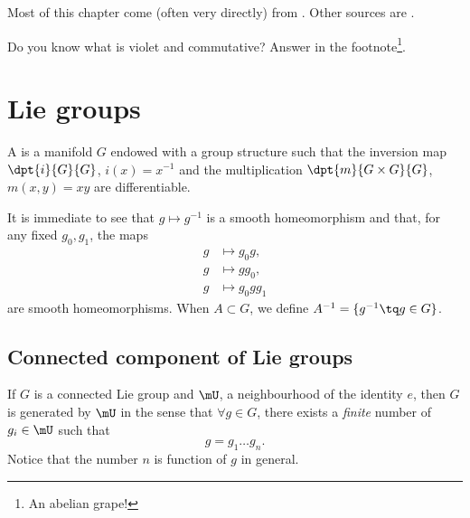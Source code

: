 
Most of this chapter come (often very directly) from \cite{Helgason}. Other sources are \cite{Knapp_reprez,DirkEnvFiniteDimNilLieAlg,SamelsonNotesLieAlg,SternLieAlgebra}.

Do you know what is violet and commutative? Answer in the footnote\footnote{An abelian grape!}.

\section{Lie groups}

\begin{definition}      \label{DEFooGDWTooTvINuw}
    A  is a manifold $G$ endowed with a group structure such that the inversion map $\dpt{i}{G}{G}$, $i(x)=x^{-1}$ and the multiplication $\dpt{m}{G\times G}{G}$, $m(x,y)=xy$ are differentiable. 
\end{definition}

 It is immediate to see that $g\mapsto g^{-1}$ is a smooth homeomorphism and that, for any fixed $g_0, g_1$, the maps
\[
\begin{split}
   g&\mapsto g_0g,\\
g&\mapsto gg_0,\\
g&\mapsto g_0gg_1
\end{split}
\]
are smooth homeomorphisms. When $A\subset G$, we define $A^{-1}=\{ g^{-1}\tq g\in G \}$.

\subsection{Connected component of Lie groups}

\begin{proposition}		\label{PropUssGpGenere} 
If $G$ is a connected Lie group and $\mU$, a neighbourhood of the identity $e$, then $G$ is generated by $\mU$ in the sense that $\forall g\in G$, there exists a \emph{finite} number of $g_{i}\in \mU$ such that
\[
  g=g_1\ldots g_n.
\]
Notice that the number $n$ is function of $g$ in general.
\end{proposition}

